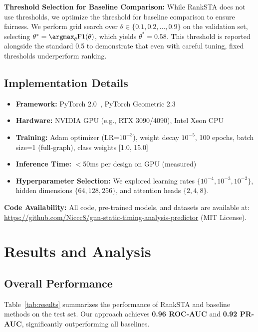 \documentclass[10pt,twocolumn,journal]{IEEEtran}
\begin{document}
\textbf{Threshold Selection for Baseline Comparison:} While RankSTA does not use thresholds, we optimize the threshold for baseline comparison to ensure fairness. We perform grid search over $\theta \in \{0.1, 0.2, \ldots, 0.9\}$ on the validation set, selecting $\theta^* = \argmax_\theta \text{F1}(\theta)$, which yields $\theta^* = 0.58$. This threshold is reported alongside the standard 0.5 to demonstrate that even with careful tuning, fixed thresholds underperform ranking.

\subsection{Implementation Details}

\begin{itemize}
    \item \textbf{Framework:} PyTorch 2.0~\cite{pytorch_geometric}, PyTorch Geometric 2.3
    \item \textbf{  Hardware:} NVIDIA GPU (e.g., RTX 3090/4090), Intel Xeon CPU
    \item \textbf{Training:} Adam optimizer (LR=$10^{-3}$), weight decay $10^{-5}$, 100 epochs, batch size=1 (full-graph), class weights [1.0, 15.0]
    \item \textbf{Inference Time:} $<$50ms per design on GPU (measured)
    \item \textbf{Hyperparameter Selection:} We explored learning rates $\{10^{-4}, 10^{-3}, 10^{-2}\}$, hidden dimensions $\{64, 128, 256\}$, and attention heads $\{2, 4, 8\}$.
\end{itemize}

\textbf{Code Availability:} All code, pre-trained models, and datasets are available at: \url{https://github.com/Niccc8/gnn-static-timing-analysis-predictor} (MIT License).

\section{Results and Analysis}
\label{sec:results}

\subsection{Overall Performance}

Table~\ref{tab:results} summarizes the performance of RankSTA and baseline methods on the test set. Our approach achieves \textbf{0.96 ROC-AUC} and \textbf{0.92 PR-AUC}, significantly outperforming all baselines.
\end{document}
